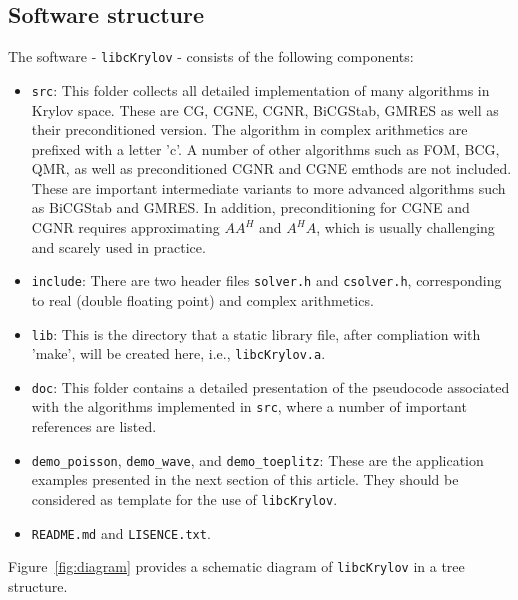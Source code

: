 \documentclass[10pt]{article}
\begin{document}
 \subsection{Software structure}

The software - \verb|libcKrylov| - consists of the following components: 
\begin{itemize}
\item \verb|src|: This folder collects all detailed implementation of many algorithms in Krylov space. These are CG, CGNE, CGNR, BiCGStab, GMRES as well as their preconditioned version. The algorithm in complex arithmetics are prefixed with a letter 'c'. A number of other algorithms such as FOM, BCG, QMR, as well as preconditioned CGNR and CGNE emthods are not included. These are important intermediate variants to more advanced algorithms such as BiCGStab and GMRES. In addition, preconditioning for CGNE and CGNR requires approximating $AA^H$ and $A^H A$, which is usually challenging and scarely used in practice.   

\item \verb|include|: There are two header files \verb|solver.h| and \verb|csolver.h|, corresponding to real (double floating point) and complex arithmetics.
  
\item \verb|lib|: This is the directory that a static library file, after compliation with 'make', will be created here, i.e., \verb|libcKrylov.a|. 
  
\item \verb|doc|: This folder contains a detailed presentation of the pseudocode associated with the algorithms implemented in \verb|src|, where a number of important references are listed. 

\item \verb|demo_poisson|, \verb|demo_wave|, and \verb|demo_toeplitz|: These are the application examples presented in the next section of this article. They should be considered as template for the use of \verb|libcKrylov|.
  
\item \verb|README.md| and \verb|LISENCE.txt|.
\end{itemize}
Figure~\ref{fig:diagram} provides a schematic diagram of \verb|libcKrylov| in a tree structure.
\end{document}
